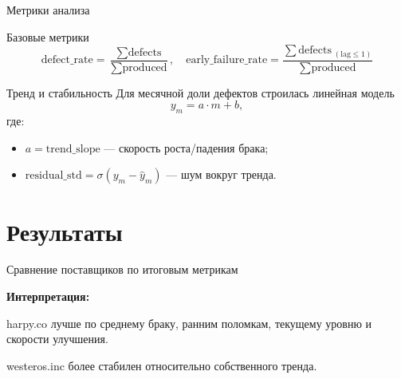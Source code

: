 \documentclass[12pt]{beamer}
\begin{document}
\begin{frame}{Метрики анализа}
    \begin{block}{Базовые метрики}
        \[
        \text{defect\_rate} =
        \frac{\sum \text{defects}}{\sum \text{produced}},
        \quad
        \text{early\_failure\_rate} =
        \frac{\sum \text{defects}_{\;(\text{lag} \le 1)}}{\sum \text{produced}}
        \]
    \end{block}

    \begin{block}{Тренд и стабильность}
        Для месячной доли дефектов строилась линейная модель
        \[
        y_m = a \cdot m + b,
        \]
        где:
        \begin{itemize}
            \item \(a = \text{trend\_slope}\) --- скорость роста/падения брака;
            \item \(\text{residual\_std} = \sigma(y_m - \hat{y}_m)\) --- шум вокруг тренда.
        \end{itemize}
    \end{block}
\end{frame}

\section{Результаты}

\begin{frame}{Сравнение поставщиков по итоговым метрикам}

\footnotesize
\begin{table}
\centering
{}
\end{table}

\vspace{0.2cm}

\footnotesize
\textbf{Интерпретация:}

harpy.co лучше по среднему браку, ранним поломкам, текущему уровню и скорости улучшения.

westeros.inc более стабилен относительно собственного тренда.

\end{frame}
\end{document}
